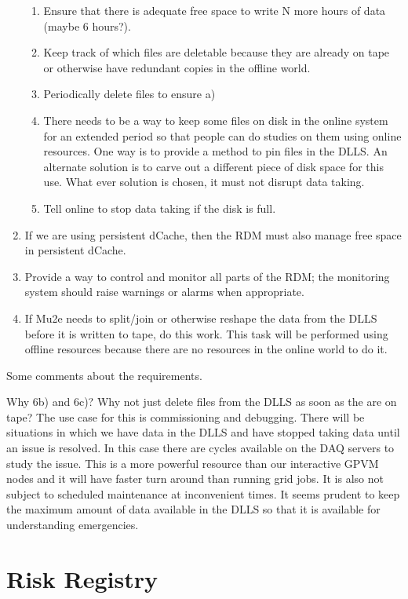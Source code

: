 \begin{enumerate}
  \begin{enumerate}
   \item Ensure that there is adequate free space to write N more hours of data (maybe 6 hours?).
   \item Keep track of which files are deletable because they are already on tape or otherwise have redundant copies in the offline world.
   \item Periodically delete files to ensure a)
   \item There needs to be a way to keep some files on disk in the online system for an extended period so that
     people can do studies on them using online resources. One way is to provide
     a method to pin files in the DLLS.  An alternate solution is to carve out a different piece of disk
     space for this use.
     What ever solution is chosen, it must not disrupt data taking.
   \item Tell online to stop data taking if the disk is full.
  \end{enumerate}
\item If we are using persistent dCache, then the RDM must also manage free space in persistent dCache.
\item Provide a way to control and monitor all parts of the RDM; the monitoring system should raise warnings or alarms when appropriate.
\item If Mu2e needs to split/join or otherwise reshape the data from the DLLS before it is written to tape, do this work.
    This task will be performed using offline resources because there are no resources in the online world to do it.
\end{enumerate}

Some comments about the requirements.

Why 6b) and 6c)?
Why not just delete files from the DLLS as soon as the are on tape?
The use case for this is commissioning and debugging.
There will be situations in which we have data in the DLLS and have stopped taking data
until an issue is resolved.
In this case there are cycles available on the DAQ servers to study the issue.
This is a more powerful resource than our interactive GPVM nodes and
it will have faster turn around than running grid jobs.
It is also not subject to scheduled maintenance at inconvenient times.
It seems prudent to keep the maximum amount of data available in the DLLS so that
it is available for understanding emergencies.


\chapter{Risk Registry}
\label{ch:RiskRegistry}

